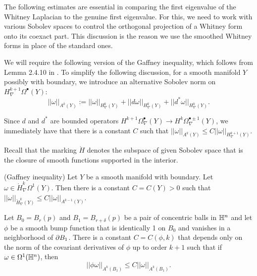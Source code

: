 The following estimates are essential in comparing the first eigenvalue of the Whitney Laplacian to the genuine first eigenvalue. For this, we need to work with various Sobolev spaces to control the orthogonal projection of a Whitney form onto its coexact part. This discussion is the reason we use the smoothed Whitney forms in place of the standard ones.

We will require the following version of the Gaffney inequality, which follows from Lemma 2.4.10 in \cite{schwarz}. To simplify the following discussion, for a smooth manifold $Y$ possibly with boundary, we introduce an alternative Sobolev norm on $H^{k+1}_{\nabla}\Omega^{\bullet}(Y)$: $$||\omega||_{A^{k}(Y)}:= ||\omega||_{H^k_{\nabla}(Y)} + ||d\omega||_{H^k_{\nabla}(Y)} + ||d^*\omega||_{H^k_{\nabla}(Y)}.$$

Since $d$ and $d^*$ are bounded operators $H^{k+1}\Omega^{\bullet}_{\nabla}(Y)\to H^{k}\Omega^{\bullet\pm 1}_{\nabla}(Y)$, we immediately have that there is a constant $C$ such that $||\omega||_{A^{k}(Y)}\leq  C ||\omega||_{H^{k+1}_{\nabla}(Y)}.$

Recall that the marking $\mathring H$ denotes the subspace of given Sobolev space that is the closure of smooth functions supported in the interior.

\begin{lem}  \label{lem: 3.5} (Gaffney inequality) Let $Y$ be a smooth manifold with boundary. Let $\omega\in \mathring{H}^k_{\nabla} \Omega^{1}(Y)$. Then there is a constant $C = C(Y)>0$ such that $||\omega||_{\mathring{H}^k_{\nabla}(Y)}\leq C ||\omega||_{A^{k-1}(Y)}$.
\end{lem}

\begin{lem} \label{lem: 3.6} 
Let $B_0 = B_r(p)$ and $B_1= B_{r+\delta}(p)$ be a pair of concentric balls in $\mathbb H^n$ and let $\phi$ be a smooth bump function that is identically 1 on $B_0$ and vanishes in a neighborhood of $\partial B_1$. There is a constant $C = C(\phi,k)$ that depends only on the norm of the covariant derivatives of $\phi$ up to order $k+1$ such that if $\omega \in \Omega^{1}(\mathbb H^n)$, then $$||\phi\omega||_{A^k(B_1)}\leq C ||\omega||_{A^k(B_1)}.$$
\end{lem}

